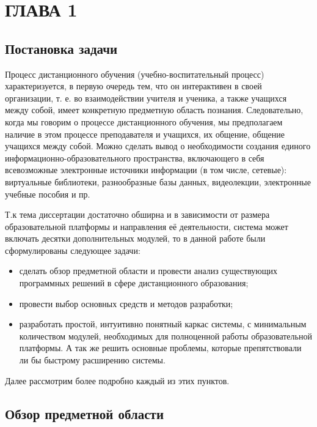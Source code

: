 \section*{ГЛАВА 1}
\setcounter{section}{1}\setcounter{subsection}{0}

\subsection{Постановка задачи}

Процесс дистанционного обучения (учебно-воспитательный процесс) характеризуется, в первую очередь
тем, что он интерактивен в своей организации, т. е. во взаимодействии учителя и ученика, а
также учащихся между собой, имеет конкретную предметную область познания. Следовательно,
когда мы говорим о процессе дистанционного обучения, мы предполагаем наличие в этом процессе
преподавателя и учащихся, их общение, общение учащихся между собой. Можно сделать вывод о
необходимости создания единого информационно-образовательного пространства, включающего в
себя всевозможные электронные источники информации (в том числе, сетевые): виртуальные
библиотеки, разнообразные базы данных, видеолекции, электронные учебные пособия и пр.

Т.к тема диссертации достаточно обширна и в зависимости от размера образовательной платформы
и направления её деятельности, система может включать десятки дополнительных модулей,
то в данной работе были сформулированы следующее задачи:
\begin{itemize}[wide,topsep=0pt]
  \itemsep0em
  \item сделать обзор предметной области и провести анализ существующих программных решений в сфере дистанционного образования;
  \item провести выбор основных средств и методов разработки;
  \item разработать простой, интуитивно понятный каркас системы, с минимальным количеством модулей,
    необходимых для полноценной работы образовательной платформы. А так же решить основные
    проблемы, которые препятствовали ли бы быстрому расширению системы.
\end{itemize}

Далее рассмотрим более подробно каждый из этих пунктов.


\subsection{Обзор предметной области}

